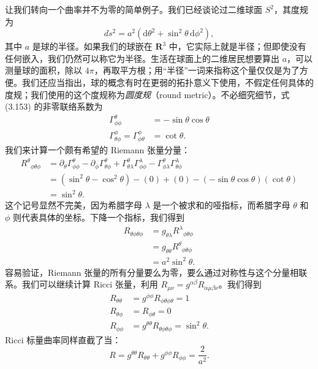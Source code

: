 让我们转向一个曲率并不为零的简单例子。我们已经谈论过二维球面 $S^2$，其度规为
\begin{equation*}
ds^2 = a^2(\mathrm{d}\theta^2 + \sin^2\theta\,\mathrm{d}\phi^2),
\tag{3.153}
\end{equation*}
其中 $a$ 是球的半径。如果我们的球嵌在 $\mathbf{R}^3$ 中，它实际上就是半径；但即使没有任何嵌入，我们仍然可以称它为半径。生活在球面上的二维居民想要算出 $a$，可以测量球的面积，除以 $4\pi$，再取平方根；用“半径”一词来指称这个量仅仅是为了方便。我们还应当指出，球的概念有时在更弱的拓扑意义下使用，不假定任何具体的度规；我们使用的这个度规称为\emph{圆度规}（round metric）。不必细究细节，式 (3.153) 的非零联络系数为
\begin{align*}
\Gamma^\theta_{\phi\phi} &= -\sin\theta\cos\theta\\
\Gamma^\phi_{\theta\phi} = \Gamma^\phi_{\phi\theta} &= \cot\theta.
\tag{3.154}
\end{align*}
我们来计算一个颇有希望的 Riemann 张量分量：
\begin{align*}
R^\theta{}_{\phi\theta\phi} &= \partial_\theta\Gamma^\theta_{\phi\phi} - \partial_\phi\Gamma^\theta_{\theta\phi} + \Gamma^\theta_{\theta\lambda}\Gamma^\lambda_{\phi\phi} - \Gamma^\theta_{\phi\lambda}\Gamma^\lambda_{\theta\phi}\\
&= (\sin^2\theta - \cos^2\theta) - (0) + (0) - (-\sin\theta\cos\theta)(\cot\theta)\\
&= \sin^2\theta.
\tag{3.155}
\end{align*}
这个记号显然不完美，因为希腊字母 $\lambda$ 是一个被求和的哑指标，而希腊字母 $\theta$ 和 $\phi$ 则代表具体的坐标。下降一个指标，我们得到
\begin{align*}
R_{\theta\phi\theta\phi} &= g_{\theta\lambda}R^\lambda{}_{\phi\theta\phi}\\
&= g_{\theta\theta}R^\theta{}_{\phi\theta\phi}\\
&= a^2\sin^2\theta.
\tag{3.156}
\end{align*}
容易验证，Riemann 张量的所有分量要么为零，要么通过对称性与这个分量相联系。我们可以继续计算 Ricci 张量，利用 $R_{\mu\nu} = g^{\alpha\beta}R_{\alpha\mu\beta\nu}$。我们得到
\begin{align*}
R_{\theta\theta} &= g^{\phi\phi}R_{\phi\theta\phi\theta} = 1\\
R_{\theta\phi} &= R_{\phi\theta} = 0\\
R_{\phi\phi} &= g^{\theta\theta}R_{\theta\phi\theta\phi} = \sin^2\theta.
\tag{3.157}
\end{align*}
Ricci 标量曲率同样直截了当：
\begin{equation*}
R = g^{\theta\theta}R_{\theta\theta} + g^{\phi\phi}R_{\phi\phi} = \frac{2}{a^2}.
\tag{3.158}
\end{equation*}

